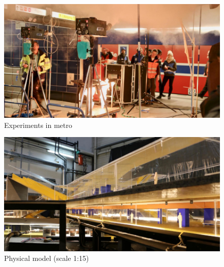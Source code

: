 \begin{frame}
\begin{minipage}{.49\textwidth}
  \begin{figure}
  \includegraphics[width=\textwidth]{figures/2017_januar_experimente_lukas_28_450px.png}
  \caption{Experiments in metro}
  \end{figure}
\end{minipage}
\hfill{}
\begin{minipage}{.49\textwidth}
  \begin{figure}
  \includegraphics[width=\textwidth]{figures/2017_februar_verbundtreffen_hamburg_002_450px.png}
  \caption{Physical model (scale 1:15)}
  \end{figure}
\end{minipage}
\end{frame}





